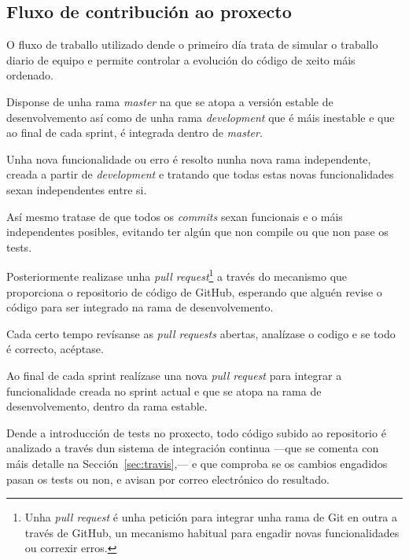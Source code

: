     \subsection{Fluxo de contribución ao proxecto}
    O fluxo de traballo utilizado dende o primeiro día trata de simular o 
traballo diario de equipo e permite controlar a evolución do código de xeito 
máis ordenado.

    Disponse de unha rama \emph{master} na que se atopa a versión estable de 
desenvolvemento así como de unha rama \emph{development} que é máis inestable e 
que ao final de cada sprint, é integrada dentro de \emph{master}.

    Unha nova funcionalidade ou erro é resolto nunha nova rama independente,
creada a partir de \emph{development} e tratando que todas estas novas 
funcionalidades sexan independentes entre si.

    Así mesmo tratase de que todos os \emph{commits} sexan funcionais e o máis 
independentes posibles, evitando ter algún que non compile ou que non pase 
os tests.

    Posteriormente realizase unha \emph{pull request}\footnote{Unha \emph{pull
request} é unha petición para integrar unha rama de Git en outra a través de
GitHub, un mecanismo habitual para engadir novas funcionalidades ou correxir
erros.} a través do mecanismo que proporciona o repositorio
de código de GitHub, esperando que alguén revise o código para ser
integrado na rama de desenvolvemento.

    Cada certo tempo revísanse as \emph{pull requests} abertas, analízase o
codigo e se todo é correcto, acéptase.

    Ao final de cada sprint realízase una nova \emph{pull request} para
integrar a funcionalidade creada no sprint actual e que se atopa na rama de
desenvolvemento, dentro da rama estable.

    Dende a introducción de tests no proxecto, todo código subido ao 
repositorio é analizado a través dun sistema de integración continua
---que se comenta con máis detalle na Sección~\ref{sec:travis},--- e que comproba se os cambios 
engadidos pasan os tests ou non, e avisan por correo 
electrónico do resultado.


